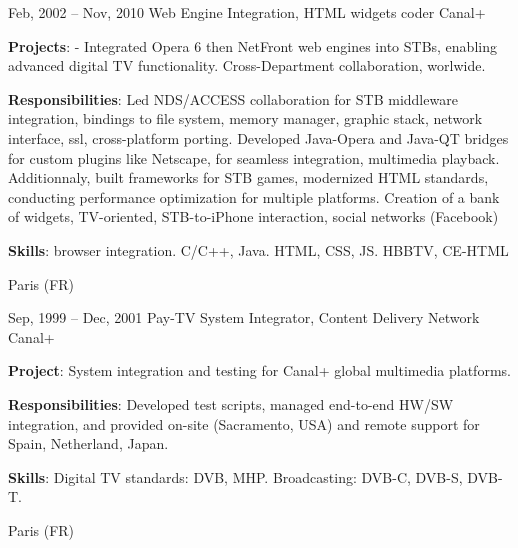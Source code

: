 \documentclass[
  a4paper,
   maincolor=cvblue,
   sectioncolor=cvblue,
   sidebarwidth=0.323\paperwidth,
]{fortysecondscv}
\begin{document}
\begin{cvtableNew}
  \cvitemRightNew
  {Feb, 2002 – Nov, 2010} %
  {Web Engine Integration, HTML widgets coder} %
  {Canal+} %
  {
    \vspace{1pt}
    \fontsize{10.8pt}{12pt}\selectfont %
    \textbf{Projects}:
    - Integrated Opera 6 then NetFront web engines into STBs, enabling advanced digital TV functionality. Cross-Department collaboration, worlwide. \par
    \vspace{4pt}
    \textbf{Responsibilities}:
    Led NDS/ACCESS collaboration for STB middleware integration, bindings to file system, memory manager, graphic stack, network interface, ssl,
    cross-platform porting.
    Developed Java-Opera and Java-QT bridges for custom plugins like Netscape, for seamless integration, multimedia playback.
    Additionnaly, built frameworks for STB games, modernized HTML standards, conducting performance optimization for multiple platforms.
    Creation of a bank of widgets, TV-oriented, STB-to-iPhone interaction, social networks (Facebook)

    \par
    \vspace{4pt}
    \textbf{Skills}: browser integration. C/C++, Java. HTML, CSS, JS. HBBTV, CE-HTML\par
  }
    {Paris (FR)} %

    \vspace{1.57mm} %

  \cvitemRightNew
    {Sep, 1999 – Dec, 2001} %
    {Pay-TV System Integrator, Content Delivery Network} %
    {Canal+} %
    {
      \vspace{1pt}
      \fontsize{10.8pt}{12pt}\selectfont %
      \textbf{Project}: System integration and testing for Canal+ global multimedia platforms.\par
      \vspace{4pt}
      \textbf{Responsibilities}: Developed test scripts, managed end-to-end HW/SW integration, and provided on-site (Sacramento, USA) and remote support for Spain, Netherland, Japan.\par
      \vspace{4pt}
      \textbf{Skills}: Digital TV standards: DVB, MHP. Broadcasting: DVB-C, DVB-S, DVB-T.\par
    }
    {Paris (FR)} %


\end{cvtableNew}
\end{document}

